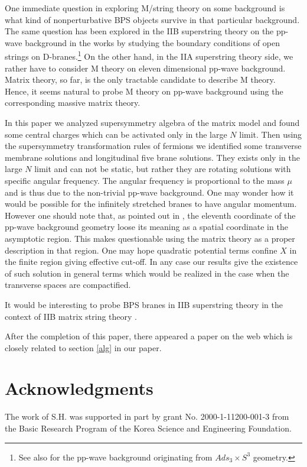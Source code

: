 \documentclass[a4paper,12pt]{article}
\begin{document}
One immediate question in exploring M/string theory on some
background is what kind of nonperturbative BPS objects survive in
that particular background. The same question has been explored in
the IIB superstring theory on the pp-wave background
\cite{bla242,met044,met109} in the works \cite{dab231,ske054} by
studying the boundary conditions of open strings on D-branes.\footnote{See 
also \cite{kns025,ak134} for the pp-wave background originating from 
$Ads_3\times S^3$ geometry.} On
the other hand, in the IIA superstring theory side, we rather have
to consider M theory on eleven dimensional pp-wave background.
Matrix theory, so far, is the only tractable candidate to describe
M theory. Hence, it seems natural to probe M theory on pp-wave
background using the corresponding massive matrix theory.

In this paper we analyzed supersymmetry algebra of the matrix
model and found some central charges which can be activated only
in the large $N$ limit. Then using the supersymmetry
transformation rules of fermions we identified some transverse
membrane solutions and longitudinal five brane solutions. They
exists only in the large $N$ limit and can not be static, but
rather they are rotating solutions with specific angular
frequency. The angular frequency is proportional to the mass $\mu$
and is thus due to the non-trivial pp-wave background. One may
wonder how it would be possible for the infinitely stretched
branes to have angular momentum. However one should note that, as
pointed out in \cite{das185}, the eleventh coordinate of the
pp-wave background geometry loose its meaning as a spatial
coordinate in the asymptotic region. This makes questionable using
the matrix theory as a proper description in that region. One may
hope quadratic potential terms confine $X$ in the finite region
giving effective cut-off. In any case our results give the
existence of such solution in general terms which would be
realized in the case when the transverse spaces are compactified.

It would be interesting to probe BPS branes in IIB superstring
theory \cite{dab231,ske054} in the context of IIB matrix string
theory \cite{gop174,bon213,ver059}.



After the completion of this paper, there appeared a paper on the
web \cite{sug070} which  is closely related to section \ref{alg}
in our paper.

\section*{Acknowledgments}
 The
work of S.H. was supported in part by grant No. 2000-1-11200-001-3
from the Basic Research Program of the Korea Science and
Engineering Foundation.
\end{document}
